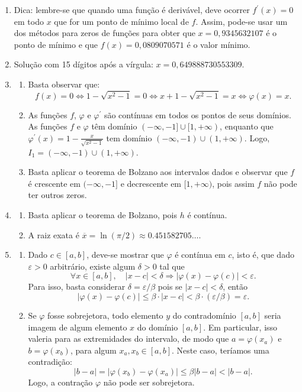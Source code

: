 \documentclass[12pt,a4paper]{article}
\begin{document}
\begin{enumerate}
\item Dica: lembre-se que quando uma função é derivável, deve ocorrer $f^\prime(x) = 0$ em todo $x$ que for um ponto de mínimo local de $f$. Assim, pode-se usar um dos métodos para zeros de funções para obter que $x = 0,9345632107$ é o ponto de mínimo e que $f(x) = 0,0809070571$ é o valor mínimo.
\item Solução com 15 dígitos após a vírgula: $x = 0,649888730553309$.
\item
\begin{enumerate}
\item Basta observar que:
\[
f(x) = 0
\Leftrightarrow
1 - \sqrt{x^2 - 1} = 0
\Leftrightarrow
x + 1 - \sqrt{x^2 - 1} = x
\Leftrightarrow
\varphi(x) = x.
\]
\item As funções $f$, $\varphi$ e $\varphi^\prime$ são contínuas em todos os pontos de seus domínios. As funções $f$ e $\varphi$ têm domínio $(-\infty, -1] \cup [1, +\infty)$, enquanto que $\varphi^\prime(x) = 1 - \frac{x}{\sqrt{x^2 - 1}}$ tem domínio $(-\infty, -1) \cup (1, +\infty)$. Logo, $I_1 = (-\infty, -1) \cup (1, +\infty)$.
\item Basta aplicar o teorema de Bolzano aos intervalos dados e observar que $f$ é crescente em $(-\infty, -1]$ e decrescente em $[1, +\infty)$, pois assim $f$ não pode ter outros zeros.
\end{enumerate}
\item \begin{enumerate}
\item Basta aplicar o teorema de Bolzano, pois $h$ é contínua.
\item A raiz exata é $\overline{x} = \ln(\pi/2) \approx 0.451582705\ldots$.
\end{enumerate}
\item \begin{enumerate}
  \item Dado $c \in [a,b]$, deve-se mostrar que $\varphi$ é contínua em $c$, isto é, que dado $\varepsilon > 0$ arbitrário, existe algum $\delta > 0$ tal que
  \[
    \forall x \in [a,b], \quad |x-c| < \delta \Rightarrow |\varphi(x)-\varphi(c)| < \varepsilon.
  \]
  Para isso, basta considerar $\delta = \varepsilon / \beta$ pois se $|x - c| < \delta$, então
  \[
    |\varphi(x)-\varphi(c)|
    \leq \beta \cdot |x-c|
    < \beta \cdot (\varepsilon / \beta)
    = \varepsilon.
  \]
  \item Se $\varphi$ fosse sobrejetora, todo elemento $y$ do contradomínio $[a, b]$ seria imagem de algum elemento $x$ do domínio $[a,b]$. Em particular, isso valeria para as extremidades do intervalo, de modo que $a = \varphi(x_a)$ e $b = \varphi(x_b)$, para algum $x_a, x_b \in [a,b]$. Neste caso, teríamos uma contradição:
  \[
    |b-a| = | \varphi(x_b) - \varphi(x_a)|
    \leq \beta |b - a|
    < |b - a|.
  \]
  Logo, a contração $\varphi$ não pode ser sobrejetora.
\end{enumerate}
\end{enumerate}
\end{document}
